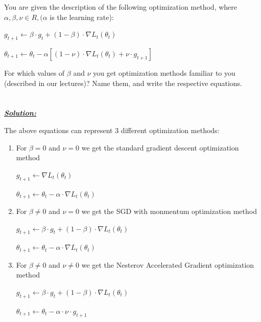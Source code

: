 \documentclass{article}
\begin{document}
\noindent You are given the description of the following optimization method, where $ \alpha, \beta, \nu \in R, (\alpha $
is the learning rate):

\begin{center}
$g_{t+1} \leftarrow \beta \cdot g_t + (1 - \beta) \cdot \nabla L_t(\theta_t) $
\end{center}
\begin{center}
$\theta_{t+1} \leftarrow \theta_t - \alpha \left[ (1 - \nu) \cdot \nabla L_t(\theta_t) + \nu \cdot g_{t+1} \right] $
\end{center}

\noindent For which values of $ \beta $ and $\nu$ you get optimization methods familiar to you (described in
our lectures)? Name them, and write the respective equations.\\ \\ \\

\noindent \underline{\textbf{\textit{Solution:}}}

\noindent The above equations can represent 3 different optimization methods:

\begin{enumerate}
  \item For $\beta = 0$ and $\nu = 0$  we get the standard gradient descent optimization method
    \begin{center}
    $g_{t+1} \leftarrow \nabla L_t(\theta_t) $
    \end{center}
    \begin{center}
    $\theta_{t+1} \leftarrow \theta_t - \alpha \cdot \nabla L_t(\theta_t)$
    \end{center}
    
  \item For $\beta \neq 0$ and $\nu = 0$ we get the SGD with monmentum optimization method
    \begin{center}
    $g_{t+1} \leftarrow \beta \cdot g_t + (1 - \beta) \cdot \nabla L_t(\theta_t) $
    \end{center}
    \begin{center}
      $\theta_{t+1} \leftarrow \theta_t - \alpha \cdot \nabla L_t(\theta_t)$
    \end{center}
    
  \item For $\beta \neq 0$ and $\nu \neq 0$ we get the Nesterov Accelerated Gradient optimization method
  \begin{center}
    $g_{t+1} \leftarrow \beta \cdot g_t + (1 - \beta) \cdot \nabla L_t(\theta_t) $
    \end{center}
    \begin{center}
    $\theta_{t+1} \leftarrow \theta_t - \alpha \cdot \nu \cdot g_{t+1} $
    \end{center}
\end{enumerate}
\end{document}
